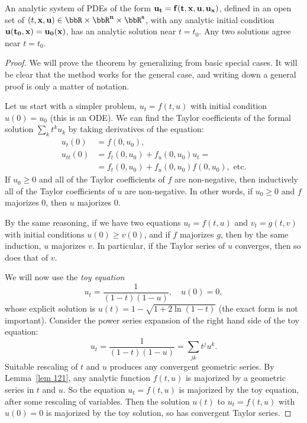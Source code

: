 \begin{thm}
    An analytic system of PDEs of the form $\bf{u}_t=\bf{f}(t,\bf{x},\bf{u},\bf{u}_{\bf x})$, defined in an open set of $(t,\bf{x},\bf{u})\in \bbR\times\bbR^n\times\bbR^s$, with any analytic initial condition $\bf{u}(t_0,\bf{x})=\bf{u}_0(\bf{x})$, has an analytic solution near $t=t_0$. Any two solutions agree near $t=t_0$.
\end{thm}
\begin{proof}
    We will prove the theorem by generalizing from basic special cases. It will be clear that the method works for the general case, and writing down a general proof is only a matter of notation.

    Let us start with a simpler problem, $u_t=f(t,u)$ with initial condition $u(0)=u_0$ (this is an ODE). We can find the Taylor coefficients of the formal solution $\sum_k t^k u_k$ by taking derivatives of the equation:
    \begin{align}
        u_t(0)&=f(0,u_0),\\
        u_{tt}(0)&=f_t(0,u_0)+f_u(0,u_0)u_t=\\
                 &=f_t(0,u_0)+f_u(0,u_0)f(0,u_0),\text{ etc.}
    \end{align}
    If $u_0\geq 0$ and all of the Taylor coefficients of $f$ are non-negative, then inductively all of the Taylor coefficients of $u$ are non-negative. In other words, if $u_0\geq 0$ and $f$ majorizes $0$, then $u$ majorizes $0$.

    By the same reasoning, if we have two equations $u_t=f(t,u)$ and $v_t=g(t,v)$ with initial conditions $u(0)\geq v(0)$, and if $f$ majorizes $g$, then by the same induction, $u$ majorizes $v$. In particular, if the Taylor series of $u$ converges, then so does that of $v$.

    We will now use the \emph{toy equation} 
    \[u_t=\frac{1}{(1-t)(1-u)},\quad u(0)=0,\]
    whose explicit solution is $u(t)=1-\sqrt{1+2\ln(1-t)}$ (the exact form is not important).
    Consider the power series expansion of the right hand side of the toy equation:
    \[
        u_t=\frac{1}{(1-t)(1-u)}=\sum_{jk}t^j u^k.
    \]
    Suitable rescaling of $t$ and $u$ produces any convergent geometric series. By Lemma~\ref{lem 121}, any analytic function $f(t,u)$ is majorized by a geometric series in $t$ and $u$. So the equation $u_t=f(t,u)$ is majorized by the toy equation, after some rescaling of variables. Then the solution $u(t)$ to $u_t=f(t,u)$ with $u(0)=0$ is majorized by the toy solution, so has convergent Taylor series.


\end{proof}
